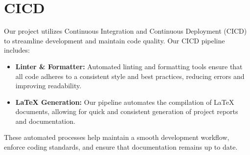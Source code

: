 \documentclass{article}
\begin{document}
\section{CICD}

Our project utilizes Continuous Integration and Continuous Deployment (CICD) to streamline development and maintain code quality. Our CICD pipeline includes:

\begin{itemize}
    \item \textbf{Linter \& Formatter:} Automated linting and formatting tools ensure that all code adheres to a consistent style and best practices, reducing errors and improving readability.
    \item \textbf{LaTeX Generation:} Our pipeline automates the compilation of LaTeX documents, allowing for quick and consistent generation of project reports and documentation.
\end{itemize}

These automated processes help maintain a smooth development workflow, enforce coding standards, and ensure that documentation remains up to date.
\end{document}
